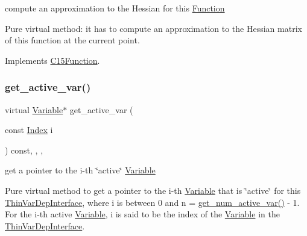 compute an approximation to the Hessian for this \mbox{\hyperlink{class_s_m_spp__di__unipi__it_1_1_function}{Function}} 

Pure virtual method\+: it has to compute an approximation to the Hessian matrix of this function at the current point. 

Implements \mbox{\hyperlink{class_s_m_spp__di__unipi__it_1_1_c15_function_a50c8f5b1802c658a795d266ba66e3c29}{C15\+Function}}.

\mbox{\label{class_s_m_spp__di__unipi__it_1_1_linear_function_a2056982790f3293a03f8cebb2f3b0d93}} 
\subsubsection{\texorpdfstring{get\+\_\+active\+\_\+var()}{get\_active\_var()}}
{\footnotesize\ttfamily virtual \mbox{\hyperlink{class_s_m_spp__di__unipi__it_1_1_variable}{Variable}}$\ast$ get\+\_\+active\+\_\+var (\begin{DoxyParamCaption}\item[{const \mbox{\hyperlink{group___thin_var_dep_interface___c_l_a_s_s_e_s_gad53d6229d7ec28555a9c9c2fd9abf773}{Index}}}]{i }\end{DoxyParamCaption}) const\hspace{0.3cm}{\ttfamily [inline]}, {\ttfamily [final]}, {\ttfamily [override]}, {\ttfamily [virtual]}}



get a pointer to the i-\/th \char`\"{}active\char`\"{} \mbox{\hyperlink{class_s_m_spp__di__unipi__it_1_1_variable}{Variable}} 

Pure virtual method to get a pointer to the i-\/th \mbox{\hyperlink{class_s_m_spp__di__unipi__it_1_1_variable}{Variable}} that is \char`\"{}active\char`\"{} for this \mbox{\hyperlink{class_s_m_spp__di__unipi__it_1_1_thin_var_dep_interface}{Thin\+Var\+Dep\+Interface}}, where i is between 0 and n = \mbox{\hyperlink{class_s_m_spp__di__unipi__it_1_1_linear_function_a9e4e36559af1c5c8ecac72598b9fea4c}{get\+\_\+num\+\_\+active\+\_\+var()}} -\/ 1. For the i-\/th active \mbox{\hyperlink{class_s_m_spp__di__unipi__it_1_1_variable}{Variable}}, i is said to be the index of the \mbox{\hyperlink{class_s_m_spp__di__unipi__it_1_1_variable}{Variable}} in the \mbox{\hyperlink{class_s_m_spp__di__unipi__it_1_1_thin_var_dep_interface}{Thin\+Var\+Dep\+Interface}}.

